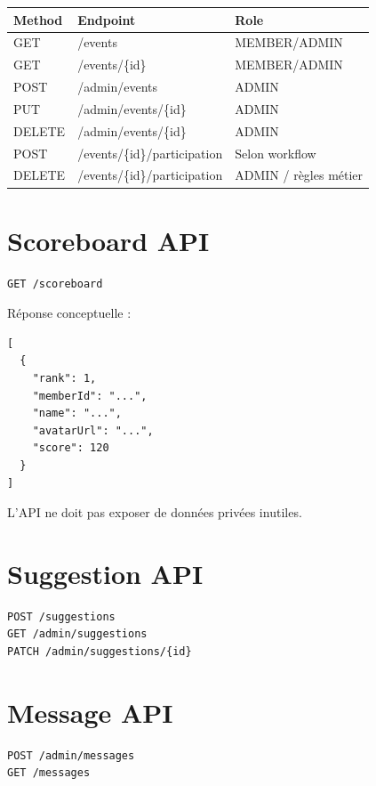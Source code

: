 \documentclass[11pt,a4paper]{report}
\begin{document}
\begin{longtable}{p{}p{}p{}}
\toprule
\textbf{Method} & \textbf{Endpoint} & \textbf{Role}\\
\midrule
GET & /events & MEMBER/ADMIN\\
GET & /events/\{id\} & MEMBER/ADMIN\\
POST & /admin/events & ADMIN\\
PUT & /admin/events/\{id\} & ADMIN\\
DELETE & /admin/events/\{id\} & ADMIN\\
POST & /events/\{id\}/participation & Selon workflow\\
DELETE & /events/\{id\}/participation & ADMIN / règles métier\\
\bottomrule
\end{longtable}

\section{Scoreboard API}

\begin{lstlisting}
GET /scoreboard
\end{lstlisting}

Réponse conceptuelle :

\begin{lstlisting}
[
  {
    "rank": 1,
    "memberId": "...",
    "name": "...",
    "avatarUrl": "...",
    "score": 120
  }
]
\end{lstlisting}

L'API ne doit pas exposer de données privées inutiles.

\section{Suggestion API}

\begin{lstlisting}
POST /suggestions
GET /admin/suggestions
PATCH /admin/suggestions/{id}
\end{lstlisting}

\section{Message API}

\begin{lstlisting}
POST /admin/messages
GET /messages
\end{lstlisting}
\end{document}
